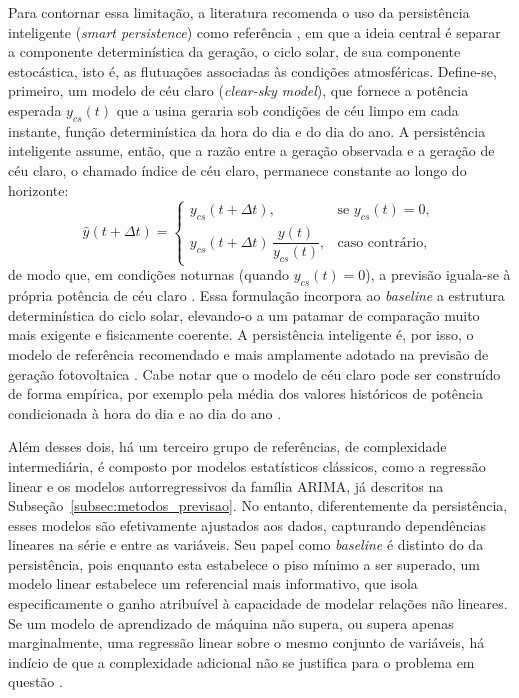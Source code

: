 Para contornar essa limitação, a literatura recomenda o uso da persistência
inteligente (\emph{smart persistence}) como referência \cite{Sarmas2022}, em que a ideia central é separar a componente determinística da geração, o ciclo solar, de sua
componente estocástica, isto é, as flutuações associadas às condições atmosféricas. Define-se,
primeiro, um modelo de céu claro (\emph{clear-sky model}), que fornece a potência
esperada $y_{cs}(t)$ que a usina geraria sob condições de céu limpo em cada instante,
função determinística da hora do dia e do dia do ano. A persistência inteligente assume,
então, que a razão entre a geração observada e a geração de céu claro, o chamado
índice de céu claro, permanece constante ao longo do horizonte:
\begin{equation}
    \hat{y}(t + \Delta t) =
    \begin{cases}
        y_{cs}(t + \Delta t), & \text{se } y_{cs}(t) = 0, \\[6pt]
        y_{cs}(t + \Delta t)\,\dfrac{y(t)}{y_{cs}(t)}, & \text{caso contrário,}
    \end{cases}
    \label{eq:smart_persistence}
\end{equation}
de modo que, em condições noturnas (quando $y_{cs}(t) = 0$), a previsão iguala-se à própria
potência de céu claro \cite{Sarmas2022}. Essa formulação incorpora ao \emph{baseline} a
estrutura determinística do ciclo solar, elevando-o a um patamar de comparação muito mais
exigente e fisicamente coerente. A persistência inteligente é, por isso, o modelo de
referência recomendado e mais amplamente adotado na previsão de geração fotovoltaica
\cite{Sarmas2022, Markovics2022}. Cabe notar que o modelo de céu claro pode ser construído de
forma empírica, por exemplo pela média dos valores históricos de potência condicionada à
hora do dia e ao dia do ano \cite{Sarmas2022}.

Além desses dois, há um terceiro grupo de referências, de complexidade intermediária, é composto por modelos estatísticos clássicos, como a regressão linear e os modelos autorregressivos da família ARIMA, já descritos na Subseção~\ref{subsec:metodos_previsao}. No entanto, diferentemente da persistência, esses modelos são efetivamente ajustados aos dados, capturando dependências lineares na série e entre as variáveis. Seu papel como \emph{baseline} é distinto do da persistência, pois enquanto esta estabelece o piso mínimo a ser superado, um modelo linear estabelece um referencial mais informativo, que isola especificamente o ganho atribuível à capacidade de modelar relações não lineares. Se um modelo de aprendizado de máquina
não supera, ou supera apenas marginalmente, uma regressão linear sobre o mesmo conjunto de
variáveis, há indício de que a complexidade adicional não se justifica para o problema em
questão \cite{Markovics2022}.


